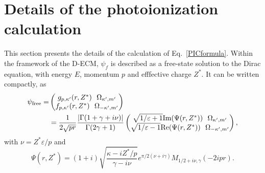  \section{Details of the photoionization calculation}
  \label{app:photo}
  
  This section presents the details of the calculation of
  Eq.~\eqref{PICformula}.  Within the framework of the D-ECM, $\psi_f$ is described as a free-state solution to the Dirac equation, with energy $E$, momentum $p$ and efffective charge $Z^*$. It can be written compactly, as \cite{PhysRev.134.A898}
  \begin{align}
    \psi_{\rm{free}} =& \left(\begin{matrix}
        g_{p,\kappa'} (r,Z^*)~~ \Omega_{\kappa',m'}
        \\
        f_{p,\kappa'} (r,Z^*)~~\Omega_{-\kappa',m'}
      \end{matrix}\right) \nonumber
      \\
      &= \frac{1}{2\sqrt{p r}}
    \frac{|\Gamma(1+\gamma+i \nu)|}{\Gamma(2\gamma+1)}
    \left(\begin{matrix}\sqrt{1/\varepsilon+1} \text{Im}(\Psi (r,Z^*))~~
        \Omega_{\kappa',m'}
        \\
        \sqrt{1/\varepsilon-1} \text{Re}(\Psi
        (r,Z^*))~~\Omega_{-\kappa',m'} \end{matrix}\right),
  \end{align}
  with $\nu = Z^* \varepsilon/p$ and
  \begin{equation}
    \Psi (r,Z^*) =(1+i)\sqrt{\frac{\kappa - i Z^*/p}{\gamma-i \nu}}
    e^{\pi/2 (\nu+i \gamma)} M_{1/2+i \nu,\gamma}(-2i p r).
  \end{equation}
  
